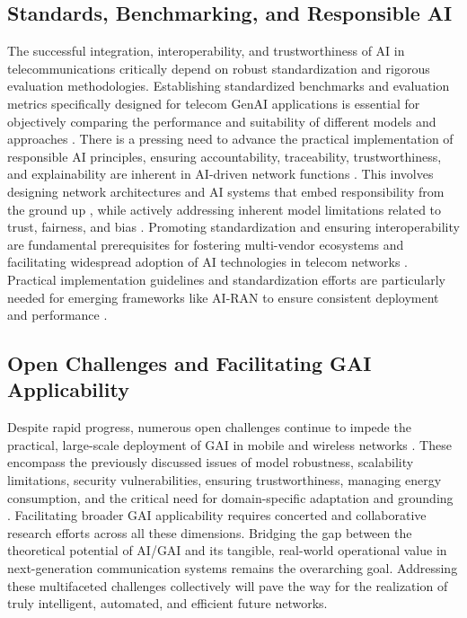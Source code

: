 \documentclass[sigconf]{acmart}
\begin{document}
\subsection{Standards, Benchmarking, and Responsible AI}

The successful integration, interoperability, and trustworthiness of AI in telecommunications critically depend on robust standardization and rigorous evaluation methodologies. Establishing standardized benchmarks and evaluation metrics specifically designed for telecom GenAI applications is essential for objectively comparing the performance and suitability of different models and approaches \cite{ref18}. There is a pressing need to advance the practical implementation of responsible AI principles, ensuring accountability, traceability, trustworthiness, and explainability are inherent in AI-driven network functions \cite{ref16}. This involves designing network architectures and AI systems that embed responsibility from the ground up \cite{ref16}, while actively addressing inherent model limitations related to trust, fairness, and bias \cite{ref8, ref17}. Promoting standardization and ensuring interoperability are fundamental prerequisites for fostering multi-vendor ecosystems and facilitating widespread adoption of AI technologies in telecom networks \cite{ref34}. Practical implementation guidelines and standardization efforts are particularly needed for emerging frameworks like AI-RAN to ensure consistent deployment and performance \cite{ref34}.

\subsection{Open Challenges and Facilitating GAI Applicability}

Despite rapid progress, numerous open challenges continue to impede the practical, large-scale deployment of GAI in mobile and wireless networks \cite{ref26}. These encompass the previously discussed issues of model robustness, scalability limitations, security vulnerabilities, ensuring trustworthiness, managing energy consumption, and the critical need for domain-specific adaptation and grounding \cite{ref2, ref4, ref5, ref6, ref8, ref15, ref17, ref21, ref25, ref29, ref31, ref34, ref35}. Facilitating broader GAI applicability requires concerted and collaborative research efforts across all these dimensions. Bridging the gap between the theoretical potential of AI/GAI and its tangible, real-world operational value in next-generation communication systems remains the overarching goal. Addressing these multifaceted challenges collectively will pave the way for the realization of truly intelligent, automated, and efficient future networks.
\end{document}
